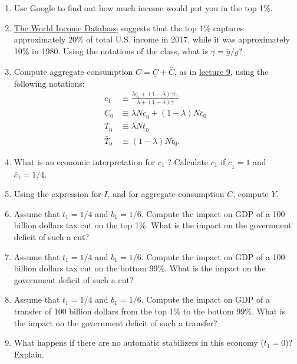 \documentclass[]{book}
\begin{document}
\begin{enumerate}
\def\labelenumi{\arabic{enumi}.}
\item
  Use Google to find out how much income would put you in the top 1\%.
\item
  \href{https://wid.world/world/\#sptinc_p99p100_z/US;FR;DE;CN;ZA;GB;WO/last/eu/k/p/yearly/s/false/4.8255/30/curve/false/country}{The
  World Income Database} suggests that the top 1\% captures
  approximately 20\% of total U.S. income in 2017, while it was
  approximately 10\% in 1980. Using the notations of the class, what is
  \(\gamma=\bar{y}/\underline{y}\)?
\item
  Compute aggregate consumption \(C= \underline{C} + \bar{C}\), as in
  \protect\hyperlink{redistributive}{lecture 9}, using the following
  notations: \[
  \begin{aligned}
  c_{1}&\equiv\frac{\lambda\underline{c}_{1}+\left(1-\lambda\right)\gamma\bar{c}_{1}}{\lambda+(1-\lambda)\gamma}\\
  C_{0}& \equiv \lambda  N \underline{c}_0 + (1-\lambda) N \bar{c}_0\\
  \underline{T}_{0}& \equiv \lambda  N \underline{t}_0\\
  \bar{T}_0 & \equiv (1-\lambda) N \bar{t}_0.
  \end{aligned}
  \]
\item
  What is an economic interpretation for \(c_1\) ? Calculate \(c_1\) if
  \(\underline{c}_1=1\) and \(\bar{c}_1=1/4\).
\item
  Using the expression for \(I\), and for aggregate consumption \(C\),
  compute \(Y\).
\item
  Assume that \(t_1=1/4\) and \(b_1=1/6\). Compute the impact on GDP of
  a 100 billion dollars tax cut on the top 1\%. What is the impact on
  the government deficit of such a cut?
\item
  Assume that \(t_1=1/4\) and \(b_1=1/6\). Compute the impact on GDP of
  a 100 billion dollars tax cut on the bottom 99\%. What is the impact
  on the government deficit of such a cut?
\item
  Assume that \(t_1=1/4\) and \(b_1=1/6\). Compute the impact on GDP of
  a transfer of 100 billion dollars from the top 1\% to the bottom 99\%.
  What is the impact on the government deficit of such a transfer?
\item
  What happens if there are no automatic stabilizers in this economy
  (\(t_1 = 0\))? Explain.
\end{enumerate}
\end{document}
